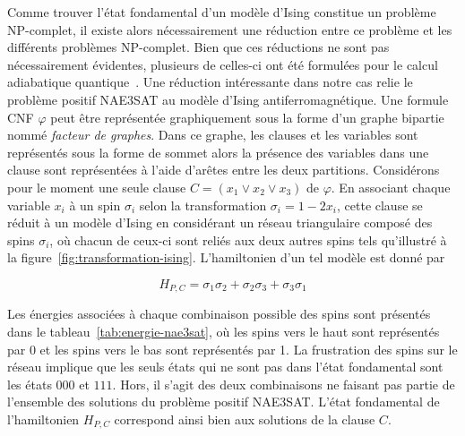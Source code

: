 Comme trouver l'état fondamental d'un modèle d'Ising constitue un problème \textsf{NP}-complet, il existe alors nécessairement une réduction entre ce problème et les différents problèmes \textsf{NP}-complet. Bien que ces réductions ne sont pas nécessairement évidentes, plusieurs de celles-ci ont été formulées pour le calcul adiabatique quantique~\cite{lucasIsingFormulationsMany2014,lodewijksMappingNPhardNPcomplete2020}. Une réduction intéressante dans notre cas relie le problème positif NAE3SAT au modèle d'Ising antiferromagnétique. Une formule CNF $\varphi$ peut être représentée graphiquement sous la forme d'un graphe bipartie nommé \textit{facteur de graphes}. Dans ce graphe, les clauses et les variables sont représentés sous la forme de sommet alors la présence des variables dans une clause sont représentées à l'aide d'arêtes entre les deux partitions. Considérons pour le moment une seule clause $C = (x_{1} \lor x_{2} \lor x_{3})$ de $\varphi$. En associant chaque variable $x_{i}$ à un spin $\sigma_{i}$ selon la transformation $\sigma_{i} = 1 - 2x_{i}$, cette clause se réduit à un modèle d'Ising en considérant un réseau triangulaire composé des spins $\sigma_{i}$, où chacun de ceux-ci sont reliés aux deux autres spins tels qu'illustré à la figure~\ref{fig:transformation-ising}. L'hamiltonien d'un tel modèle est donné par

\begin{equation}
    H_{P, C} = \sigma_{1}\sigma_{2} + \sigma_{2}\sigma_{3} + \sigma_{3}\sigma_{1}
\end{equation}

Les énergies associées à chaque combinaison possible des spins sont présentés dans le tableau~\ref{tab:energie-nae3sat}, où les spins vers le haut sont représentés par 0 et les spins vers le bas sont représentés par 1. La frustration des spins sur le réseau implique que les seuls états qui ne sont pas dans l'état fondamental sont les états $000$ et $111$. Hors, il s'agit des deux combinaisons ne faisant pas partie de l'ensemble des solutions du problème positif NAE3SAT. L'état fondamental de l'hamiltonien $H_{P, C}$ correspond ainsi bien aux solutions de la clause $C$.

